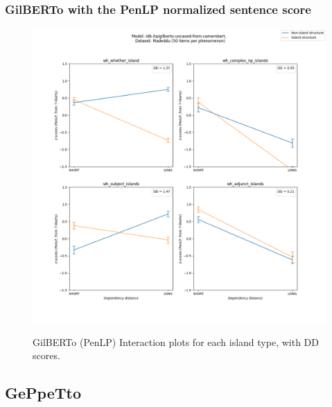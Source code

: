 \subsubsection{GilBERTo with the PenLP normalized sentence score}
\begin{figure}[h]
	\centering
	\includegraphics[width=1\textwidth]{images/AppendixA/Madeddu_wh_idb-ita_gilberto-uncased-from-camembert_PenLP-zscores-likert-2022-09-16_h10m26s47.png} 
	\label{A-fig:md_gilberto_penlp}
	\caption{GilBERTo (PenLP) Interaction plots for each island type, with DD scores.}
\end{figure}

\clearpage
\subsection{GePpeTto}
